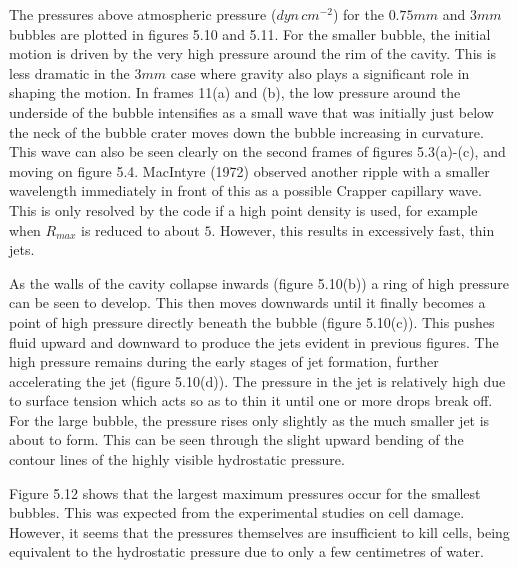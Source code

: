 The pressures above atmospheric pressure ($dyn\,cm^{-2}$) for the $0.75mm$
and $3mm$ bubbles are plotted in
figures 5.10 and 5.11. For the smaller bubble, the initial motion is driven
by the very high pressure around the rim of the cavity. This is less
dramatic in the $3mm$ case where gravity also plays a significant role
in shaping the motion.
In frames 11(a) and (b),
the low pressure around the underside of the bubble intensifies
as a small wave
that was initially just below the neck of the bubble crater
moves down the bubble increasing in curvature. This wave can also be seen
clearly on the second frames of figures 5.3(a)-(c), and moving on 
figure 5.4.
MacIntyre (1972) observed another ripple with a smaller wavelength
immediately in front of this as a possible Crapper capillary wave.
This is only resolved by the code if a high point density is
used, for example when $R_{max}$ is reduced to about $5$.
However, this results in excessively fast, thin jets.

As the walls of the cavity collapse inwards (figure 5.10(b))
a ring of high pressure can be seen to 
develop. This then moves downwards until it finally becomes a
point of high pressure directly beneath the bubble (figure 5.10(c)).
This pushes fluid upward and downward to produce the
jets evident in previous figures. The high pressure remains during the 
early stages of
jet formation, further accelerating the jet (figure 5.10(d)).
The pressure in the jet is relatively high due to surface tension which
acts so as to thin it until one or more drops break off.
For the large bubble, the pressure rises only slightly as the much smaller jet is
about to form. This can be seen through the slight upward bending of the
contour lines of the highly visible hydrostatic pressure.

Figure 5.12 shows that the largest maximum pressures occur for the smallest
bubbles. 
This was expected from the experimental studies on cell damage. However, 
it seems that the pressures themselves
are insufficient to kill cells, being equivalent to the hydrostatic 
pressure due to only a few centimetres of water.

